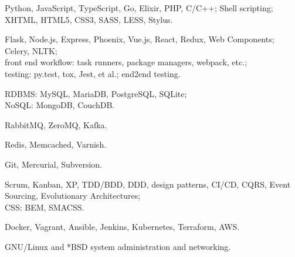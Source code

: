 \documentclass{resume}
\begin{document}
\begin{skillssection}
        {Python, JavaScript, TypeScript, Go, Elixir, PHP, C/C++; Shell
            scripting;\\%
            XHTML, HTML5, CSS3, SASS, LESS, Stylus.}

        {Flask, Node.js, Express, Phoenix, Vue.js, React, Redux, Web
            Components; Celery, NLTK;\\%
            front end workflow: task runners, package managers, webpack,
            etc.;\\%
            testing: py.test, tox, Jest, et al.; end2end testing.}

        {RDBMS: MySQL, MariaDB, PostgreSQL, SQLite;\\%
            NoSQL: MongoDB, CouchDB.}

        {RabbitMQ, ZeroMQ, Kafka.}

        {Redis, Memcached, Varnish.}

        {Git, Mercurial, Subversion.}

        {Scrum, Kanban, XP, TDD/BDD, DDD, design patterns, CI/CD, CQRS, Event
            Sourcing, Evolutionary Architectures;\\%
            CSS: BEM, SMACSS.}

        {Docker, Vagrant, Ansible, Jenkins, Kubernetes, Terraform, AWS.}

        {GNU/Linux and *BSD system administration and networking.}
\end{skillssection}
\end{document}
